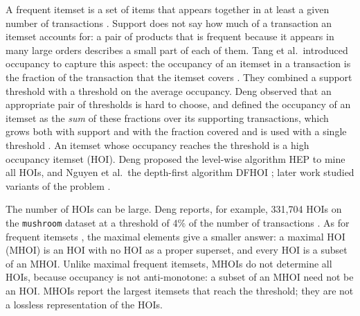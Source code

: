 \documentclass[pdflatex,sn-mathphys,Numbered]{sn-jnl}
\theoremstyle{thmstyleone}
\theoremstyle{thmstyletwo}
\theoremstyle{thmstylethree}
\begin{document}
A frequent itemset is a set of items that appears together in at least a given number of transactions \cite{agrawal1993mining}. Support does not say how much of a transaction an itemset accounts for: a pair of products that is frequent because it appears in many large orders describes a small part of each of them. Tang et al.\ introduced occupancy to capture this aspect: the occupancy of an itemset in a transaction is the fraction of the transaction that the itemset covers \cite{tang2012occupancy,zhang2015occupancy}. They combined a support threshold with a threshold on the average occupancy. Deng observed that an appropriate pair of thresholds is hard to choose, and defined the occupancy of an itemset as the \emph{sum} of these fractions over its supporting transactions, which grows both with support and with the fraction covered and is used with a single threshold \cite{deng2020hoi}. An itemset whose occupancy reaches the threshold is a high occupancy itemset (HOI). Deng proposed the level-wise algorithm HEP to mine all HOIs, and Nguyen et al.\ the depth-first algorithm DFHOI \cite{nguyen2023dfhoi}; later work studied variants of the problem \cite{datta2022hoimto,kim2022incremental,tran2025namhep,yildirim2025topk,ngo2026topk,cho2026damped}.

The number of HOIs can be large. Deng reports, for example, 331,704 HOIs on the \texttt{mushroom} dataset at a threshold of 4\% of the number of transactions \cite[Table~3]{deng2020hoi}. As for frequent itemsets \cite{bayardo1998maxminer}, the maximal elements give a smaller answer: a maximal HOI (MHOI) is an HOI with no HOI as a proper superset, and every HOI is a subset of an MHOI. Unlike maximal frequent itemsets, MHOIs do not determine all HOIs, because occupancy is not anti-monotone: a subset of an MHOI need not be an HOI. MHOIs report the largest itemsets that reach the threshold; they are not a lossless representation of the HOIs.
\end{document}
